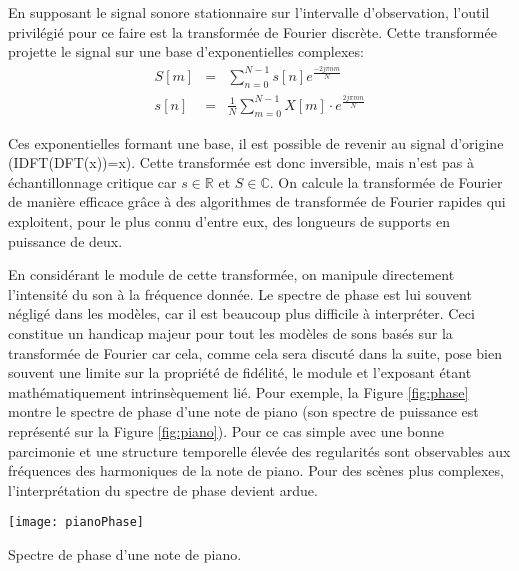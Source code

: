 En supposant le signal sonore stationnaire sur l'intervalle d'observation, l'outil privilégié pour ce faire est la transformée de Fourier discrète. Cette transformée projette le signal sur une base d'exponentielles complexes:
\begin{eqnarray}
  S[m] &=& \sum_{n=0}^{N-1} s[n] e^{\frac{-2j \pi nm}{N}} \\
  s[n] &=& \frac{1}{N} \sum_{m=0}^{N-1} X[m] \cdot e^{\frac{ 2 j \pi m n }{N}}
\end{eqnarray}

Ces exponentielles formant une base, il est possible de revenir au signal d'origine (IDFT(DFT(x))=x). Cette transformée est donc inversible, mais n'est pas à échantillonnage critique car $s\in \mathbb{R}$  et $S \in \mathbb{C}$. On calcule la transformée de Fourier de manière efficace grâce à des algorithmes de transformée de Fourier rapides qui exploitent, pour le plus connu d'entre eux, des longueurs de supports en puissance de deux.

En considérant le module de cette transformée, on manipule directement l'intensité du son à la fréquence donnée. Le spectre de phase est lui souvent négligé dans les modèles, car il est beaucoup plus difficile à interpréter. Ceci constitue un handicap majeur pour tout les modèles de sons basés sur la transformée de Fourier car cela, comme cela sera discuté dans la suite, pose bien souvent une limite sur la propriété de fidélité, le module et l'exposant étant mathématiquement intrinsèquement lié. Pour exemple, la Figure \ref{fig:phase} montre le spectre de phase d'une note de piano (son spectre de puissance est représenté sur la Figure \ref{fig:piano}). Pour ce cas simple avec une bonne parcimonie et une structure temporelle élevée des regularités sont observables aux fréquences des harmoniques de la note de piano. Pour des scènes plus complexes, l'interprétation du spectre de phase devient ardue.

\begin{marginfigure}
  \label{fig:phase}
  \begin{center}
  \texttt{[image: pianoPhase]}
\end{center}
  \caption{Spectre de phase d'une note de piano.}
\end{marginfigure}

